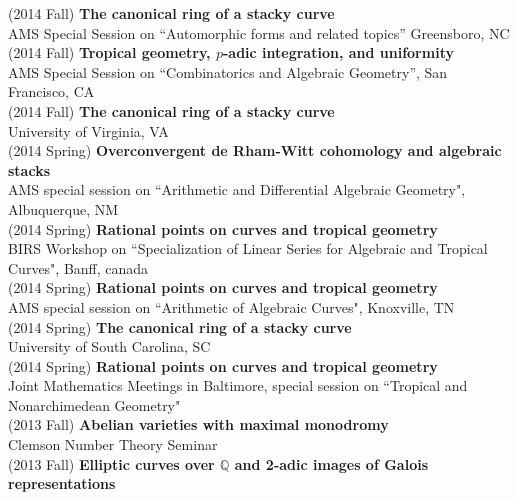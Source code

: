\documentclass[margin,line]{res}
\begin{document}
\begin{resume}
(2014 Fall) \textbf{The canonical ring of a stacky curve}\\
AMS Special Session on ``Automorphic forms and related topics'' Greensboro, NC
\vspace{.05cm}\\
(2014 Fall) \textbf{Tropical geometry, $p$-adic integration, and uniformity}\\
AMS Special Session on ``Combinatorics and Algebraic Geometry'', San Francisco, CA
\vspace{.05cm}\\
(2014 Fall) \textbf{The canonical ring of a stacky curve}\\  
University of Virginia, VA
\vspace{.05cm}\\
(2014 Spring) \textbf{Overconvergent de Rham-Witt cohomology and algebraic stacks}\\  
AMS special session on ``Arithmetic and Differential Algebraic Geometry", Albuquerque, NM
\vspace{.05cm}\\
(2014 Spring) \textbf{Rational points on curves and tropical geometry}\\  
BIRS Workshop on ``Specialization of Linear Series for Algebraic and Tropical Curves", Banff, canada
\vspace{.05cm}\\
(2014 Spring) \textbf{Rational points on curves and tropical geometry}\\  
AMS special session on ``Arithmetic of Algebraic Curves", Knoxville, TN
\vspace{.05cm}\\
(2014 Spring) \textbf{The canonical ring of a stacky curve}\\  
University of South Carolina, SC
\vspace{.05cm}\\
(2014 Spring) \textbf{Rational points on curves and tropical geometry}\\  
Joint Mathematics Meetings in Baltimore, special session on ``Tropical and Nonarchimedean Geometry"  
\vspace{.05cm}\\
(2013 Fall) \textbf{Abelian varieties with maximal monodromy}\\  
Clemson Number Theory Seminar 
\vspace{.05cm}\\
(2013 Fall) \textbf{Elliptic curves over $\mathbb{Q}$ and 2-adic images of Galois representations}\\  

\end{resume}
\end{document}
